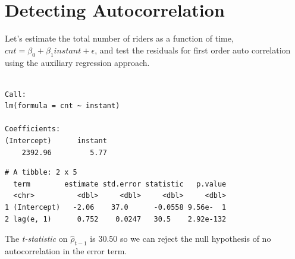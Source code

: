\documentclass[]{book}
\newenvironment{Shaded}{\begin{snugshade}}{\end{snugshade}}
\newcommand{\CommentTok}[1]{\textcolor[rgb]{0.56,0.35,0.01}{\textit{#1}}}
\newcommand{\DecValTok}[1]{\textcolor[rgb]{0.00,0.00,0.81}{#1}}
\newcommand{\KeywordTok}[1]{\textcolor[rgb]{0.13,0.29,0.53}{\textbf{#1}}}
\newcommand{\NormalTok}[1]{#1}
\newcommand{\OperatorTok}[1]{\textcolor[rgb]{0.81,0.36,0.00}{\textbf{#1}}}
\newcommand{\StringTok}[1]{\textcolor[rgb]{0.31,0.60,0.02}{#1}}
\begin{document}
\hypertarget{detecting-autocorrelation}{%
\section{Detecting Autocorrelation}\label{detecting-autocorrelation}}

Let's estimate the total number of riders as a function of time, \(cnt=\beta_0+\beta_1instant+\epsilon\), and test the residuals for first order auto correlation using the auxiliary regression approach.

\begin{Shaded}
\end{Shaded}

\begin{verbatim}

Call:
lm(formula = cnt ~ instant)

Coefficients:
(Intercept)      instant  
    2392.96         5.77  
\end{verbatim}

\begin{Shaded}
\end{Shaded}

\begin{verbatim}
# A tibble: 2 x 5
  term        estimate std.error statistic   p.value
  <chr>          <dbl>     <dbl>     <dbl>     <dbl>
1 (Intercept)   -2.06    37.0      -0.0558 9.56e-  1
2 lag(e, 1)      0.752    0.0247   30.5    2.92e-132
\end{verbatim}

The \emph{t-statistic} on \(\hat\rho_{t-1}\) is 30.50 so we can reject the null hypothesis of no autocorrelation in the error term.
\end{document}
